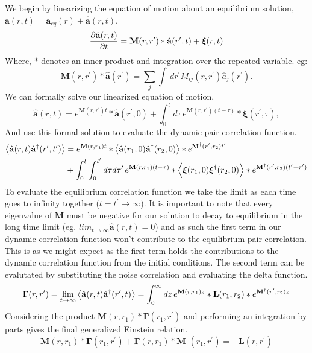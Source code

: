 We begin by linearizing the equation of motion about an equilibrium solution,
$\mathbf{a}(r, t) = \mathbf{a}_{eq}(r) + \hat{\mathbf{a}}(r, t)$.
%
\begin{equation} \frac{\partial \hat{\mathbf{a}} (r, t)}{\partial t} =
\mathbf{M}(r, r^\prime) \ast \hat{\mathbf{a}}(r^\prime, t) +
\boldsymbol{\xi}(r, t) \end{equation}
%
Where, $\ast$ denotes an inner product and integration over the repeated
variable. eg:
%
\begin{equation} \mathbf{M}(r, r^\prime)\ast \hat{\mathbf{a}}(r^\prime) =
\sum_j \int\,dr^\prime M_{ij}(r, r^\prime) \hat{a}_j(r^\prime).  \end{equation}
%
We can formally solve our linearized equation of motion,
%
\begin{equation} \hat{\mathbf{a}}(r, t) = e^{\mathbf{M}(r,
r^\prime)t}\ast\hat{\mathbf{a}}(r^\prime, 0) + \int_0^t d\tau\,
e^{\mathbf{M}(r, r^\prime)(t-\tau)} \ast \boldsymbol{\xi} (r^\prime, \tau),
\end{equation}
%
And use this formal solution to evaluate the dynamic pair correlation function.
%
\begin{align} \left\langle \hat{\mathbf{a}}(r,
    t)\hat{\mathbf{a}}^\dagger(r^\prime, t^\prime) \right\rangle &=
    e^{\mathbf{M}(r, r_1)t}\ast\left\langle \hat{\mathbf{a}}(r_1,
    0)\hat{\mathbf{a}}^\dagger(r_2, 0) \right\rangle \ast
    e^{\mathbf{M}^\dagger(r^\prime, r_2)t^\prime} \nonumber \\ &+ \int_0^t
\int_0^{t^\prime}d\tau d\tau^\prime\, e^{\mathbf{M}(r,
r_1)(t-\tau)}\ast\left\langle \boldsymbol{\xi}(r_1,
0)\boldsymbol{\xi}^\dagger(r_2, 0) \right\rangle \ast
e^{\mathbf{M}^\dagger(r^\prime, r_2)(t^\prime-\tau^\prime)} \end{align}
%
To evaluate the equilibrium correlation function we take the limit as each time
goes to infinity together ($t = t^\prime \rightarrow \infty$). It is important
to note that every eigenvalue of $\mathbf{M}$ must be negative for our solution
to decay to equilibrium in the long time limit (eg.
$lim_{t\rightarrow\infty}\hat{\mathbf{a}}(r, t) = 0$) and as such the first
term in our dynamic correlation function won't contribute to the equilibrium
pair correlation. This is as we might expect as the first term holds the
contributions to the dynamic correlation function from the initial conditions.
The second term can be evalutated by substituting the noise correlation and
evaluating the delta function.
%
\begin{equation} \mathbf{\Gamma}(r, r^\prime) = \lim_{t\rightarrow\infty}
\left\langle \hat{\mathbf{a}}(r, t)\hat{\mathbf{a}}^\dagger(r^\prime, t) \right\rangle
= \int_0^\infty dz \,e^{\mathbf{M}(r, r_1)z}\ast\mathbf{L}(r_1, r_2)\ast
e^{\mathbf{M}^\dagger(r^\prime, r_2)z} \end{equation}
%
Considering the product $\mathbf{M}(r, r_1)\ast\mathbf{\Gamma}(r_1, r^\prime)$
and performing an integration by parts gives the final generalized Einstein
relation.
%
\begin{equation} \mathbf{M}(r, r_1)\ast\mathbf{\Gamma}(r_1, r^\prime) +
\mathbf{\Gamma}(r, r_1)\ast\mathbf{M}^\dagger(r_1, r^\prime) = -\mathbf{L}(r,
r^\prime) \end{equation}
%

